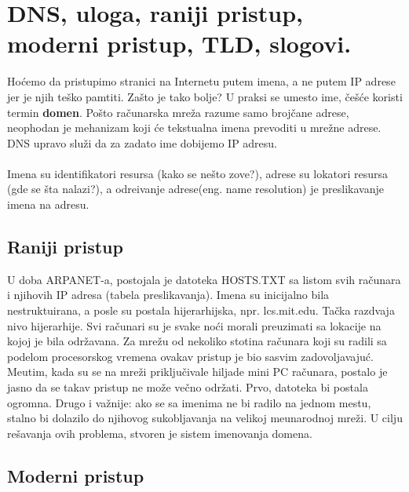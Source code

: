 \documentclass{article} %
\begin{document}
\section{DNS, uloga, raniji pristup, moderni pristup, TLD, slogovi.}

Ho\' cemo da pristupimo stranici na Internetu putem imena, a ne putem IP adrese jer je njih te\v sko pamtiti. Za\v sto je tako bolje?  U praksi se umesto ime, \v ce\v s\' ce koristi termin \textbf{domen}. Po\v sto ra\v cunarska mre\v za razume samo broj\v cane adrese, neophodan  je mehanizam koji \' ce tekstualna imena prevoditi u mre\v zne adrese. DNS upravo slu\v zi da za zadato ime dobijemo IP adresu.
\\
\\Imena su identifikatori resursa (kako se ne\v sto zove?), adrese su lokatori resursa (gde se \v sta nalazi?), a odre\dj ivanje adrese(eng. name resolution) je preslikavanje imena na adresu.

\subsection{Raniji pristup}

U doba ARPANET-a, postojala je datoteka HOSTS.TXT sa listom svih ra\v cunara i njihovih IP adresa (tabela preslikavanja). Imena su inicijalno bila nestruktuirana, a posle su postala hijerarhijska, npr. lcs.mit.edu. Ta\v cka razdvaja nivo hijerarhije. Svi ra\v cunari su je svake no\' ci morali preuzimati sa lokacije na kojoj je bila odr\v zavana. Za mre\v zu od nekoliko stotina ra\v cunara koji su radili sa podelom procesorskog vremena ovakav pristup je bio sasvim zadovoljavaju\' c. Me\dj utim, kada su se na mre\v zi priklju\v civale hiljade mini PC ra\v cunara, postalo je jasno da se takav pristup ne mo\v ze ve\v cno odr\v zati. Prvo, datoteka  bi postala ogromna. Drugo i va\v znije:  ako se sa imenima ne bi radilo na jednom mestu, stalno bi dolazilo do  njihovog sukobljavanja  na velikoj me\dj unarodnoj mre\v zi. U cilju re\v savanja ovih problema, stvoren je sistem imenovanja domena. 

\subsection{Moderni pristup}
 
\end{document}
